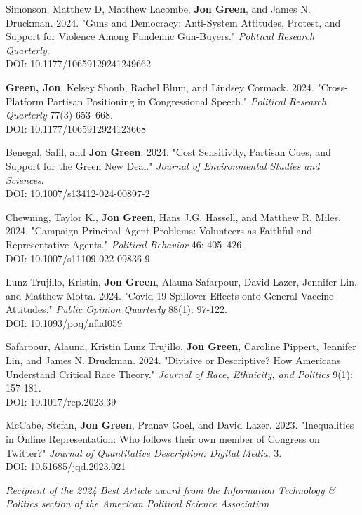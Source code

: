 \documentclass[letterpaper]{article}
\renewenvironment{itemize}{
  \begin{list}{}{
    \setlength{\leftmargin}{1.5em}
  }
}{
  \end{list}
}
\begin{document}
\begin{etaremune}
\item Simonson, Matthew D, Matthew Lacombe, \textbf{Jon Green}, and James N. Druckman. 2024. "Guns and Democracy: Anti-System Attitudes, Protest, and Support for Violence Among Pandemic Gun-Buyers." \textit{Political Research Quarterly}. \\
DOI: 10.1177/10659129241249662

\item \textbf{Green, Jon}, Kelsey Shoub, Rachel Blum, and Lindsey Cormack. 2024. "Cross-Platform Partisan Positioning in Congressional Speech." \textit{Political Research Quarterly} 77(3) 653–668. \\
DOI: 10.1177/1065912924123668

\item Benegal, Salil, and \textbf{Jon Green}. 2024. "Cost Sensitivity, Partisan Cues, and Support for the Green New Deal." \textit{Journal of Environmental Studies and Sciences}. \\
DOI: 10.1007/s13412-024-00897-2

\item Chewning, Taylor K., \textbf{Jon Green}, Hans J.G. Hassell, and Matthew R. Miles. 2024. "Campaign Principal-Agent Problems: Volunteers as Faithful and Representative Agents." \textit{Political Behavior} 46: 405–426. \\
DOI: 10.1007/s11109-022-09836-9

\item Lunz Trujillo, Kristin, \textbf{Jon Green}, Alauna Safarpour, David Lazer, Jennifer Lin, and Matthew Motta. 2024. "Covid-19 Spillover Effects onto General Vaccine Attitudes." \textit{Public Opinion Quarterly} 88(1): 97-122.\\
DOI: 10.1093/poq/nfad059

\item Safarpour, Alauna, Kristin Lunz Trujillo, \textbf{Jon Green}, Caroline Pippert, Jennifer Lin, and James N. Druckman. 2024. "Divisive or Descriptive? How Americans Understand Critical Race Theory." \textit{Journal of Race, Ethnicity, and Politics} 9(1): 157-181. \\
DOI: 10.1017/rep.2023.39

\item McCabe, Stefan, \textbf{Jon Green}, Pranav Goel, and David Lazer. 2023. "Inequalities in Online Representation: Who follows their own member of Congress on Twitter?" \textit{Journal of Quantitative Description: Digital Media}, 3. \\
DOI: 10.51685/jqd.2023.021
\begin{itemize}
\item \textit{Recipient of the 2024 Best Article award from the Information Technology \& Politics section of the American Political Science Association}
\end{itemize}


\end{etaremune}
\end{document}
